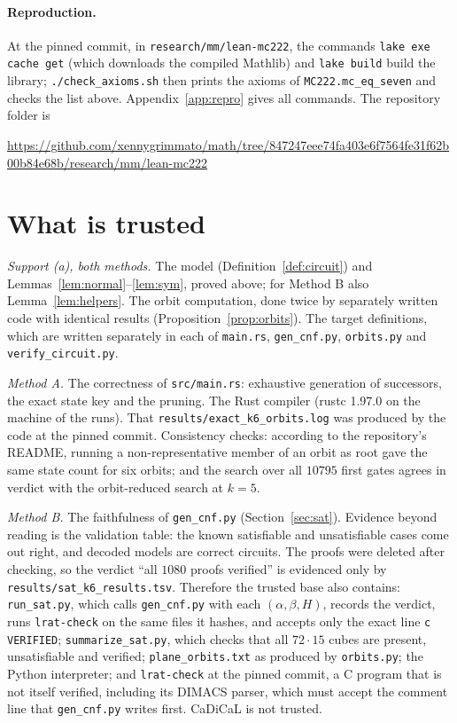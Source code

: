 \documentclass[11pt,a4paper]{article}
\theoremstyle{definition}
\newcommand{\code}[1]{\texttt{#1}}
\newcommand{\leanrepo}{\url{https://github.com/xennygrimmato/math/tree/847247eee74fa403e6f7564fe31f62b00b84e68b/research/mm/lean-mc222}}
\begin{document}
\paragraph{Reproduction.} At the pinned commit, in \code{research/mm/lean-mc222}, the commands \code{lake exe cache get} (which downloads the compiled Mathlib) and \code{lake build} build the library; \code{./check\_axioms.sh} then prints the axioms of \code{MC222.mc\_eq\_seven} and checks the list above. Appendix~\ref{app:repro} gives all commands. The repository folder is
\begin{center}\footnotesize \leanrepo\end{center}

\section{What is trusted}\label{sec:trust}

\emph{Support (a), both methods.} The model (Definition~\ref{def:circuit}) and Lemmas~\ref{lem:normal}--\ref{lem:sym}, proved above; for Method B also Lemma~\ref{lem:helpers}. The orbit computation, done twice by separately written code with identical results (Proposition~\ref{prop:orbits}). The target definitions, which are written separately in each of \code{main.rs}, \code{gen\_cnf.py}, \code{orbits.py} and \code{verify\_circuit.py}.

\emph{Method A.} The correctness of \code{src/main.rs}: exhaustive generation of successors, the exact state key and the pruning. The Rust compiler (rustc 1.97.0 on the machine of the runs). That \code{results/exact\_k6\_orbits.log} was produced by the code at the pinned commit. Consistency checks: according to the repository's README, running a non-representative member of an orbit as root gave the same state count for six orbits; and the search over all $10795$ first gates agrees in verdict with the orbit-reduced search at $k=5$.

\emph{Method B.} The faithfulness of \code{gen\_cnf.py} (Section~\ref{sec:sat}). Evidence beyond reading is the validation table: the known satisfiable and unsatisfiable cases come out right, and decoded models are correct circuits. The proofs were deleted after checking, so the verdict ``all $1080$ proofs verified'' is evidenced only by \code{results/sat\_k6\_results.tsv}. Therefore the trusted base also contains: \code{run\_sat.py}, which calls \code{gen\_cnf.py} with each $(\alpha,\beta,H)$, records the verdict, runs \code{lrat-check} on the same files it hashes, and accepts only the exact line \code{c VERIFIED}; \code{summarize\_sat.py}, which checks that all $72\cdot15$ cubes are present, unsatisfiable and verified; \code{plane\_orbits.txt} as produced by \code{orbits.py}; the Python interpreter; and \code{lrat-check} at the pinned commit, a C program that is not itself verified, including its DIMACS parser, which must accept the comment line that \code{gen\_cnf.py} writes first. CaDiCaL is not trusted.
\end{document}
